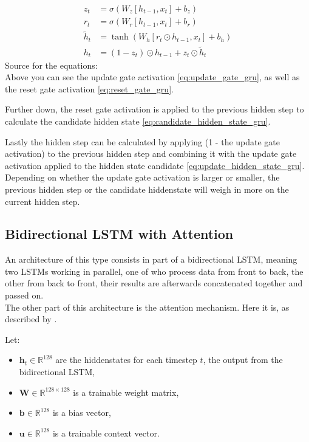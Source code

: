 \documentclass{article}
\begin{document}
\begin{align}
    z_t &= \sigma\!\left(W_z [h_{t-1}, x_t] + b_z\right) \label{eq:update_gate_gru} \\
    r_t &= \sigma\!\left(W_r [h_{t-1}, x_t] + b_r\right) \label{eq:reset_gate_gru} \\
    \tilde{h}_t &= \tanh\!\left(W_h [r_t \odot h_{t-1}, x_t] + b_h\right) \label{eq:candidate_hidden_state_gru} \\
    h_t &= (1 - z_t) \odot h_{t-1} + z_t \odot \tilde{h}_t \label{eq:update_hidden_state_gru}
\end{align}
Source for the equations: \cite{geeksforgeeks_gru}
\\[2em]
Above you can see the update gate activation \eqref{eq:update_gate_gru}, as well 
as the reset gate activation \eqref{eq:reset_gate_gru}.

Further down, the reset gate activation is applied to the previous hidden step 
to calculate the candidate hidden state \eqref{eq:candidate_hidden_state_gru}. 

Lastly the hidden step can be calculated by applying (1 - the update gate 
activation) to the previous hidden step and combining it with the update gate 
activation applied to the hidden state candidate \eqref{eq:update_hidden_state_gru}. 
Depending on whether the update gate activation is larger or smaller, the 
previous hidden step or the candidate hiddenstate will weigh in more on the 
current hidden step.

\subsection{Bidirectional LSTM with Attention}

An architecture of this type consists in part of a bidirectional LSTM, meaning 
two LSTMs working in parallel, one of who process data from front to back, the 
other from back to front, their results are afterwards concatenated together 
and passed on.
\\[2em]
The other part of this architecture is the attention mechanism. Here it is, as 
described by \cite{bahdanau2016neuralmachinetranslationjointly}.

Let:
\begin{itemize}
    \item $\mathbf{h}_t \in \mathbb{R}^{128}$ are the hiddenstates for each 
    timestep $t$, the output from the bidirectional LSTM,
    \item $\mathbf{W} \in \mathbb{R}^{128 \times 128}$ is a trainable weight 
    matrix,
    \item $\mathbf{b} \in \mathbb{R}^{128}$ is a bias vector,
    \item $\mathbf{u} \in \mathbb{R}^{128}$ is a trainable context vector.
\end{itemize}
\end{document}
